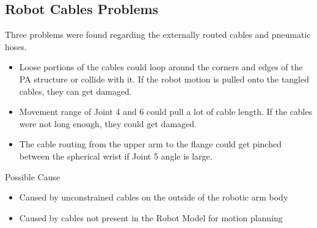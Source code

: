 \subsection{Robot Cables Problems}
Three problems were found regarding the externally routed cables and pneumatic hoses. 
\begin{itemize}
\item Loose portions of the cables could loop around the corners and edges of the PA structure or collide with it. If the robot motion is pulled onto the tangled cables, they can get damaged.
\item Movement range of Joint 4 and 6 could pull a lot of cable length. If the cables were not long enough, they could get damaged.
\item The cable routing from the upper arm to the flange could get pinched between the spherical wrist if Joint 5 angle is large.
\end{itemize}


Possible Cause

\begin{itemize}
\item Caused by unconstrained cables on the outside of the robotic arm body
\item Caused by cables not present in the Robot Model for motion planning
\end{itemize}

